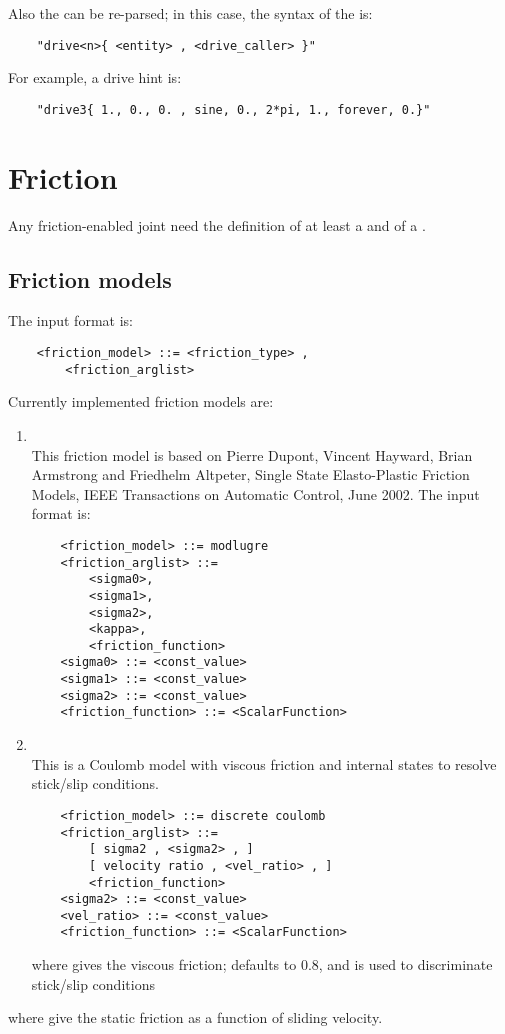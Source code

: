 \noindent
Also the  can be re-parsed; in this case, the syntax
of the  is:
\begin{verbatim}
    "drive<n>{ <entity> , <drive_caller> }"
\end{verbatim}
For example, a  drive hint is:
\begin{verbatim}
    "drive3{ 1., 0., 0. , sine, 0., 2*pi, 1., forever, 0.}"
\end{verbatim}






\section{Friction}
Any friction-enabled joint need the definition of
at least a  and of a .
\subsection{Friction models}
The  input format is:
\begin{verbatim}
    <friction_model> ::= <friction_type> ,
        <friction_arglist>
\end{verbatim}
Currently implemented friction models are:
\begin{enumerate}
    \item {}\\
    This friction model is based on 
    Pierre Dupont, Vincent Hayward, Brian Armstrong and
    Friedhelm Altpeter, Single State Elasto-Plastic Friction Models,
    IEEE Transactions on Automatic Control, June 2002. The input format is:
    \begin{verbatim}
    <friction_model> ::= modlugre
    <friction_arglist> ::=
        <sigma0>,
        <sigma1>,
        <sigma2>,
        <kappa>,
        <friction_function>
    <sigma0> ::= <const_value>
    <sigma1> ::= <const_value>
    <sigma2> ::= <const_value>
    <friction_function> ::= <ScalarFunction>
    \end{verbatim}
    \item {}\\
    This is a Coulomb model with viscous friction and
    internal states to resolve stick/slip conditions.
    \begin{verbatim}
    <friction_model> ::= discrete coulomb
    <friction_arglist> ::=
        [ sigma2 , <sigma2> , ]
        [ velocity ratio , <vel_ratio> , ]
        <friction_function>
    <sigma2> ::= <const_value>
    <vel_ratio> ::= <const_value>
    <friction_function> ::= <ScalarFunction>
    \end{verbatim}
    where  gives the viscous friction;
     defaults to 0.8, and is used
    to discriminate stick/slip conditions
\end{enumerate}
where  give the static friction
as a function of sliding velocity.
